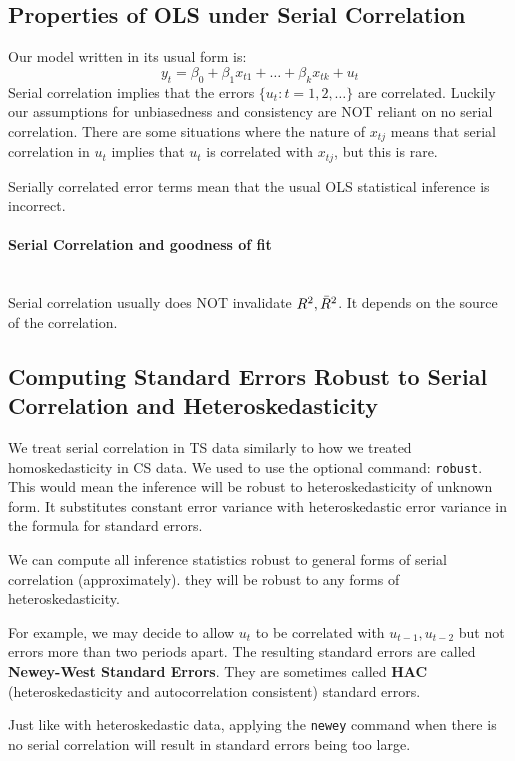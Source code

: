 \documentclass[11pt]{article}
\begin{document}
\subsection{Properties of OLS under Serial Correlation}

Our model written in its usual form is:
\[y_t = \beta_0 + \beta_1 x_{t1} + \ldots + \beta_k x_{tk} + u_t\]
Serial correlation implies that the errors $\{u_t: t=1,2,\ldots\}$ are correlated. Luckily our assumptions for unbiasedness and consistency are NOT reliant on no serial correlation. There are some situations where the nature of $x_{tj}$ means that serial correlation in $u_t$ implies that $u_t$ is correlated with $x_{tj}$, but this is rare.

Serially correlated error terms mean that the usual OLS statistical inference is incorrect.

\paragraph{Serial Correlation and goodness of fit}\mbox{} \\

Serial correlation usually does NOT invalidate $R^2, \Bar{R}^2$. It depends on the source of the correlation.

\subsection{Computing Standard Errors Robust to Serial Correlation and Heteroskedasticity}

We treat serial correlation in TS data similarly to how we treated homoskedasticity in CS data. We used to use the optional command: \lstinline{robust}. This would mean the inference will be robust to heteroskedasticity of unknown form. It substitutes constant error variance with heteroskedastic error variance in the formula for standard errors. 

We can compute all inference statistics robust to general forms of serial correlation (approximately). they will be robust to any forms of heteroskedasticity.

For example, we may decide to allow $u_t$ to be correlated with $u_{t-1}, u_{t-2}$ but not errors more than two periods apart. The resulting standard errors are called \textbf{Newey-West Standard Errors}. They are sometimes called \textbf{HAC} (heteroskedasticity and autocorrelation consistent) standard errors.

Just like with heteroskedastic data, applying the \lstinline{newey} command when there is no serial correlation will result in standard errors being too large.
\end{document}

